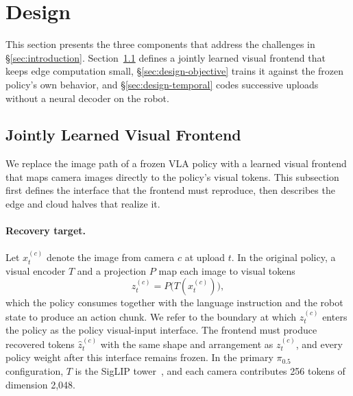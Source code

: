 \section{Design}
\label{sec:design}
This section presents the three components that address the challenges
in \S\ref{sec:introduction}. Section~\ref{sec:design-frontend} defines a
jointly learned visual frontend that keeps edge computation small,
\S\ref{sec:design-objective} trains it against the frozen policy's own
behavior, and \S\ref{sec:design-temporal} codes successive uploads without
a neural decoder on the robot.

\subsection{Jointly Learned Visual Frontend}
\label{sec:design-frontend}
We replace the image path of a frozen VLA policy with a learned visual
frontend that maps camera images directly to the policy's visual tokens.
This subsection first defines the interface that the frontend must
reproduce, then describes the edge and cloud halves that realize it.

\paragraph{Recovery target.}
Let $x_t^{(c)}$ denote the image from camera $c$ at upload $t$. In the
original policy, a visual encoder $T$ and a projection $P$ map each image
to visual tokens
\begin{equation}
  z_t^{(c)} = P\big(T(x_t^{(c)})\big),
  \label{eq:teacher_tokens}
\end{equation}
which the policy consumes together with the language instruction and the
robot state to produce an action chunk. We refer to the boundary at which
$z_t^{(c)}$ enters the policy as the policy visual-input interface. The
frontend must produce recovered tokens $\hat{z}_t^{(c)}$ with the same
shape and arrangement as $z_t^{(c)}$, and every policy weight after this
interface remains frozen. In the primary $\pi_{0.5}$ configuration, $T$
is the SigLIP tower~\cite{siglip}, and each camera contributes 256 tokens
of dimension 2,048.

